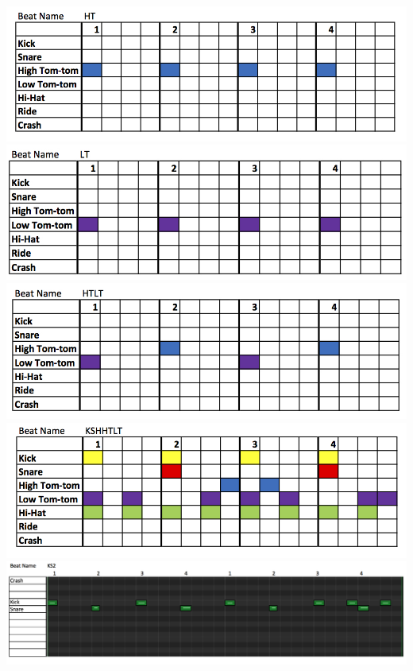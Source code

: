 \documentclass[a4paper, 11pt]{article}
\begin{document}
\begin{center}
\includegraphics[scale=0.3]{images/HT.jpg}\\
\includegraphics[scale=0.3]{images/LT.jpg}\\
\includegraphics[scale=0.3]{images/HTLT.jpg}\\
\includegraphics[scale=0.3]{images/KSHHTLT.jpg}\\
\includegraphics[scale=0.25]{images/KS2.jpg}\\

\end{center}
\end{document}
